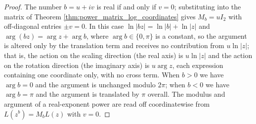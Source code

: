 \begin{proof}
The number $b=u+iv$ is real if and only if $v=0$; substituting into the matrix of Theorem \ref{thm:power_matrix_log_coordinates} gives $M_b=uI_2$ with off-diagonal entries $\pm v=0$. In this case $\ln|bz|=\ln|b|+\ln|z|$ and $\arg(bz)=\arg z+\arg b$, where $\arg b\in\{0,\pi\}$ is a constant, so the argument is altered only by the translation term and receives no contribution from $u\ln|z|$; that is, the action on the scaling direction (the real axis) is $u\ln|z|$ and the action on the rotation direction (the imaginary axis) is $u\arg z$, each expression containing one coordinate only, with no cross term. When $b>0$ we have $\arg b=0$ and the argument is unchanged modulo $2\pi$; when $b<0$ we have $\arg b=\pi$ and the argument is translated by $\pi$ overall. The modulus and argument of a real-exponent power are read off coordinatewise from $L(z^b)=M_bL(z)$ with $v=0$.
\end{proof}

